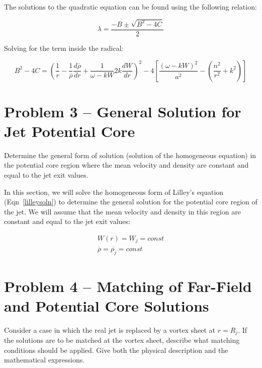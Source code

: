 \documentclass[]{aiaa-tc}%
\begin{document}
The solutions to the quadratic equation can be found using the following relation:

\begin{equation}
\lambda = \dfrac{-B \pm \sqrt{B^2-4C}}{2}
\end{equation}

Solving for the term inside the radical:

\begin{equation}
B^2-4C =
\left(\dfrac{1}{r}
    - \dfrac{1}{\overline{\rho}}\frac{d \overline{\rho}}{dr}
    + \dfrac{1}{\omega - kW} 2k \dfrac{dW}{dr} \right) ^2
-4 \left[
    \dfrac{(\omega - kW)^2}{\overline{a^2}}
    - \left( \dfrac{n^2}{r^2} + k^2 \right) \right]
\end{equation}







\section{Problem 3 -- General Solution for Jet Potential Core} %

Determine the general form of solution (solution of the homogeneous equation) in the potential core region where the mean velocity and density are constant and equal to the jet exit values.

In this section, we will solve the homogeneous form of Lilley's equation (Eqn~\ref{lilleysoln}) to determine the general solution for the potential core region of the jet.  We will assume that the mean velocity and density in this region are constant and equal to the jet exit values:

\begin{align}
W(r)=W_j=const \\
\overline{\rho} = \overline{\rho_j} = const
\end{align}


\section{Problem 4 -- Matching of Far-Field and Potential Core Solutions}

Consider a case in which the real jet is replaced by a vortex sheet at $r = R_j$. If the solutions are to be matched at the vortex sheet, describe what matching conditions should be applied. Give both the physical description and the mathematical expressions.
\end{document}
